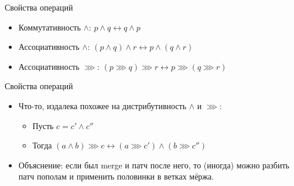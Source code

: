 \begin{frame}{Свойства операций}
  \begin{itemize}
  \item Коммутативность $\wedge$: $p \wedge q \longleftrightarrow q
    \wedge p$
  \item Ассоциативность $\wedge$: $(p \wedge q) \wedge r
    \longleftrightarrow p \wedge (q \wedge r)$
  \item Ассоциативность $\ggg$: $(p \ggg q) \ggg r \longleftrightarrow
    p \ggg (q \ggg r)$
  \end{itemize}
\end{frame}

\begin{frame}[fragile]{Свойства операций}
  \begin{itemize}
  \item Что-то, издалека похожее на дистрибутивность $\wedge$ и $\ggg$:
    \begin{itemize}
    \item Пусть $c = c' \wedge c''$
    \item Тогда $(a \wedge b) \ggg c \longleftrightarrow (a \ggg c')
      \wedge (b \ggg c'') $
    \end{itemize}
  \item Объяснение: если был merge и патч после него, то (иногда)
    можно разбить патч пополам и применить половинки в ветках мёржа.
  \end{itemize}
  
  
\end{frame}
